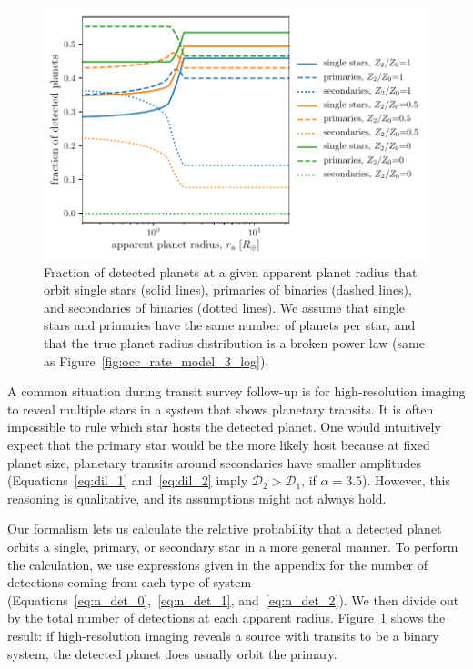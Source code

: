 \documentclass[12pt,modern]{aastex61}
\begin{document}
\begin{figure}[!t]
    \centering
    \includegraphics[width=\textwidth]{figures/ndet_vs_radius_logx_model_3_fraclines_rpu_22.5_manyZs.pdf}
    \caption{
        Fraction of detected planets at a given apparent planet radius
        that orbit single stars (solid lines), primaries of binaries
        (dashed lines), and secondaries of binaries (dotted lines).
        We assume that single stars and primaries have the same number
        of planets per star, and that the true planet radius
        distribution is a broken power law
        (same as Figure~\ref{fig:occ_rate_model_3_log}).
    }
    \label{fig:frac_model_3}
\end{figure}

A common situation during transit survey follow-up is for
high-resolution imaging to reveal multiple stars in a system that
shows planetary transits.  It is often impossible to rule which star
hosts the detected planet.  One would intuitively expect that the
primary star would be the more likely host because at fixed planet
size, planetary transits around secondaries have smaller amplitudes
(Equations~\ref{eq:dil_1} and~\ref{eq:dil_2} imply
$\mathcal{D}_2>\mathcal{D}_1$, if $\alpha=3.5$).  However, this
reasoning is qualitative, and its assumptions might not always hold.

Our formalism lets us calculate the relative probability that a
detected planet orbits a single, primary, or secondary star in a more
general manner.  To perform the calculation, we use expressions given
in the appendix for the number of detections coming from each type of
system (Equations~\ref{eq:n_det_0},~\ref{eq:n_det_1},
and~\ref{eq:n_det_2}).  We then divide out by the total number of
detections at each apparent radius.  Figure~\ref{fig:frac_model_3}
shows the result: if high-resolution imaging reveals a source with
transits to be a binary system, the detected planet does usually orbit
the primary.
\end{document}
